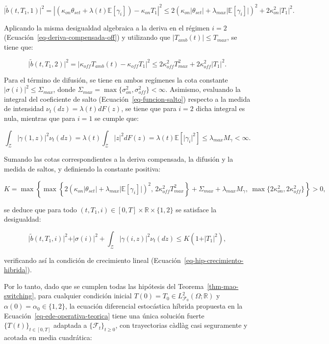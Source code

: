 \documentclass[
  spanish,
  us-letterpaper,
]{scrreprt}
\numberwithin{equation}{section}
\theoremstyle{plain}
\theoremstyle{plain}
\theoremstyle{plain}
\theoremstyle{definition}
\theoremstyle{remark}
\begin{document}
\[
\vert \tilde{b}(t, T_1, 1) \vert^2 = \left\vert \left( \kappa_{on}\theta_{set} + \lambda(t)\mathbb{E}[\gamma_i] \right) - \kappa_{on}T_1 \right\vert^2 \le 2\left( \kappa_{on}\vert \theta_{set} \vert + \lambda_{max}\vert \mathbb{E}[\gamma_i] \vert \right)^2 + 2\kappa_{on}^2 \vert T_1 \vert^2.
\]

Aplicando la misma desigualdad algebraica a la deriva en el régimen
\(i = 2\) (Ecuación~\ref{eq-deriva-compensada-off}) y utilizando que
\(\vert T_{amb}(t) \vert \le T_{max}\), se tiene que:

\[
\vert \tilde{b}(t, T_1, 2) \vert^2 = \vert \kappa_{off}T_{amb}(t) - \kappa_{off}T_1 \vert^2 \le 2\kappa_{off}^2 T_{max}^2 + 2\kappa_{off}^2 \vert T_1 \vert^2.
\]

Para el término de difusión, se tiene en ambos regímenes la cota
constante \(\vert \sigma(i) \vert^2 \le \Sigma_{max}\), donde
\(\Sigma_{max} = \max\{\sigma_{on}^2, \sigma_{off}^2\} < \infty\).
Asimismo, evaluando la integral del coeficiente de salto
(Ecuación~\ref{eq-funcion-salto}) respecto a la medida de intensidad
\(\nu_t(dz) = \lambda(t)dF(z)\), se tiene que para \(i = 2\) dicha
integral es nula, mientras que para \(i = 1\) se cumple que:

\[
\int_{\mathcal{Z}} \vert \gamma(1, z) \vert^2 \nu_t(dz) = \lambda(t) \int_{\mathcal{Z}} \vert z \vert^2 dF(z) = \lambda(t) \mathbb{E}[\vert \gamma_i \vert^2] \le \lambda_{max} M_\gamma < \infty.
\]

Sumando las cotas correspondientes a la deriva compensada, la difusión y
la medida de saltos, y definiendo la constante positiva:

\[
K = \max\left\{ \max\left\{ 2\left( \kappa_{on}\vert \theta_{set} \vert + \lambda_{max}\vert \mathbb{E}[\gamma_i] \vert \right)^2, \, 2\kappa_{off}^2 T_{max}^2 \right\} + \Sigma_{max} + \lambda_{max} M_\gamma, \ \max\{2\kappa_{on}^2, 2\kappa_{off}^2\} \right\} > 0,
\]

se deduce que para todo
\((t, T_1, i) \in [0, T] \times \mathbb{R} \times \{1, 2\}\) se
satisface la desigualdad:

\[
\vert \tilde{b}(t, T_1, i) \vert^2 + \vert \sigma(i) \vert^2 + \int_{\mathcal{Z}} \vert \gamma(i, z) \vert^2 \nu_t(dz) \le K\left( 1 + \vert T_1 \vert^2 \right),
\]

verificando así la condición de crecimiento lineal
(Ecuación~\ref{eq-hip-crecimiento-hibrida}).

Por lo tanto, dado que se cumplen todas las hipótesis del
Teorema~\ref{thm-mao-switching}, para cualquier condición inicial
\(T(0) = T_0 \in L^2_{\mathcal{F}_0}(\Omega; \mathbb{R})\) y
\(\alpha(0) = \alpha_0 \in \{1, 2\}\), la ecuación diferencial
estocástica híbrida propuesta en la
Ecuación~\ref{eq-ede-operativa-teorica} tiene una única solución fuerte
\(\{T(t)\}_{t \in [0, T]}\) adaptada a \(\{\mathcal{F}_t\}_{t \ge 0}\),
con trayectorias càdlàg casi seguramente y acotada en media cuadrática:
\end{document}
